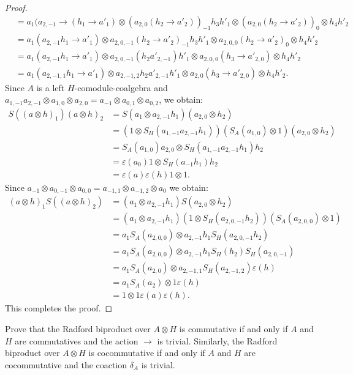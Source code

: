 \begin{proof}
\begin{align*}
 & =a_{1}(a_{2,-1}\to(h_{1}\to a'_{1})\otimes(a_{2,0}(h_{2}\to a'_{2}))_{-1}h_{3}h'_{1}\otimes(a_{2,0}(h_{2}\to a'_{2}))_{0}\otimes h_{4}h'_{2}\\
 & =a_{1}(a_{2,-1}h_{1}\to a'_{1})\otimes a_{2,0,-1}(h_{2}\to a'_{2})_{-1}h_{3}h'_{1}\otimes a_{2,0,0}(h_{2}\to a'_{2})_{0}\otimes h_{4}h'_{2}\\
 & =a_{1}(a_{2,-1}h_{1}\to a'_{1})\otimes a_{2,0,-1}(h_{2}a'_{2,-1})h'_{1}\otimes a_{2,0,0}(h_{3}\to a'_{2,0})\otimes h_{4}h'_{2}\\
 & =a_{1}(a_{2,-1,1}h_{1}\to a'_{1})\otimes a_{2,-1,2}h_{2}a'_{2,-1}h'_{1}\otimes a_{2,0}(h_{3}\to a'_{2,0})\otimes h_{4}h'_{2}.
\end{align*}
Since $A$ is a left $H$-comodule-coalgebra and $a_{1,-1}a_{2,-1}\otimes a_{1,0}\otimes a_{2,0}=a_{-1}\otimes a_{0,1}\otimes a_{0,2}$,
we obtain: 
\begin{align*}
S((a\otimes h)_{1})(a\otimes h)_{2} & =S(a_{1}\otimes a_{2,-1}h_{1})(a_{2,0}\otimes h_{2})\\
 & =(1\otimes S_{H}(a_{1,-1}a_{2,-1}h_{1}))(S_{A}(a_{1,0})\otimes1)(a_{2,0}\otimes h_{2})\\
 & =S_{A}(a_{1,0})a_{2,0}\otimes S_{H}(a_{1,-1}a_{2,-1}h_{1})h_{2}\\
 & =\varepsilon(a_{0})1\otimes S_{H}(a_{-1}h_{1})h_{2}\\
 & =\varepsilon(a)\varepsilon(h)1\otimes1.
\end{align*}
Since $a_{-1}\otimes a_{0,-1}\otimes a_{0,0}=a_{-1,1}\otimes a_{-1,2}\otimes a_{0}$ we obtain:
\begin{align*}
(a\otimes h)_{1}S((a\otimes h)_{2}) & =(a_{1}\otimes a_{2,-1}h_{1})S(a_{2,0}\otimes h_{2})\\
 & =(a_{1}\otimes a_{2,-1}h_{1})(1\otimes S_{H}(a_{2,0,-1}h_{2}))(S_{A}(a_{2,0,0})\otimes1)\\
 & =a_{1}S_{A}(a_{2,0,0})\otimes a_{2,-1}h_{1}S_{H}(a_{2,0,-1}h_{2})\\
 & =a_{1}S_{A}(a_{2,0,0})\otimes a_{2,-1}h_{1}S_{H}(h_{2})S_{H}(a_{2,0,-1})\\
 & =a_{1}S_{A}(a_{2,0})\otimes a_{2,-1,1}S_{H}(a_{2,-1,2})\varepsilon(h)\\
 & =a_{1}S_{A}(a_{2})\otimes1\varepsilon(h)\\
 & =1\otimes1\varepsilon(a)\varepsilon(h).
 \end{align*}
This completes the proof.
\end{proof}

\begin{exercise}
Prove that the Radford biproduct over $A\otimes H$ is commutative if and only
if $A$ and $H$ are commutatives and the action $\to$ is trivial.  Similarly,
the Radford biproduct over $A\otimes H$ is cocommutative if and only if $A$ and
$H$ are cocommutative and the coaction $\delta_{A}$ is trivial.
\end{exercise}

